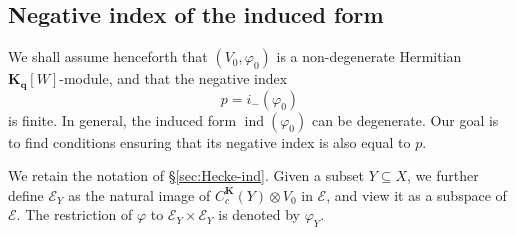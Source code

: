 \documentclass[12pt,a4paper]{amsproc}
\theoremstyle{definition}
\DeclareMathOperator{\Ind}{ind}
\newcommand{\KK}{\mathbf K}
\newcommand{\qq}{\mathbf q}
\begin{document}
	
\subsection{Negative index of the induced form}
We shall assume henceforth that $(V_0, \varphi_0)$ is a non-degenerate Hermitian $\KK_\qq[W]$-module, and that the negative index 
$$ p = i_-(\varphi_0)$$
is finite.  In general, the induced form $\Ind(\varphi_0)$  can be degenerate. 
 Our goal is to find conditions ensuring that its negative index is also equal to $p$. 

We retain the notation of \S\ref{sec:Hecke-ind}. 
Given a subset $Y \subseteq X$, we further define $\mathscr E_Y$ as the natural image of $C^\KK_c(Y) \otimes V_0$ in $\mathscr E$, and view it as a subspace of $\mathscr E$. The restriction of $\varphi$ to  $\mathscr E_Y \times \mathscr E_Y$ is denoted by $\varphi_Y$. 
\end{document}
